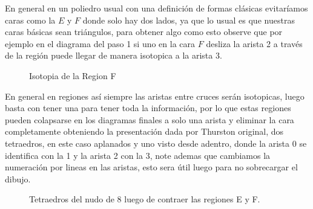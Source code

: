 \begin{note}
    En general en un poliedro usual con una definición de formas clásicas evitaríamos caras como la $E$ y $F$ donde solo hay dos lados, ya que lo usual es que nuestras caras básicas sean triángulos, para obtener algo como esto observe que por ejemplo en el diagrama del paso 1 si uno en la cara $F$ desliza la arista 2 a través de la región puede llegar de manera isotopica a la arista 3.
    \begin{figure}[H]
    \centering
    
        \caption{Isotopia de la Region F}
    \end{figure}
    En general en regiones así siempre las aristas entre cruces serán isotopicas, luego basta con tener una para tener toda la información, por lo que estas regiones pueden colapsarse en los diagramas finales a solo una arista y eliminar la cara completamente obteniendo la presentación dada por Thurston original, dos tetraedros, en este caso aplanados y uno visto desde adentro, donde la arista 0 se identifica con la 1 y la arista 2 con la 3, note ademas que cambiamos la numeración por lineas en las aristas, esto sera útil luego para no sobrecargar el dibujo.
    \begin{figure}[H]
    \centering
    
       \caption{Tetraedros del nudo de 8 luego de contraer las regiones E y F.} 
    \end{figure}
\end{note}
